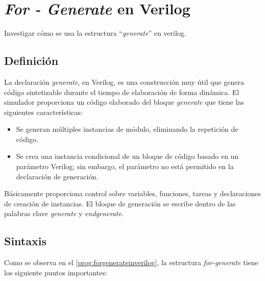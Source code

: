 \section{\textit{For - Generate} en Verilog \label{sec:s2}}

\begin{center}
	\begin{minipage}{12cm}
		\begin{tcolorbox}[title=Actividad 2]
			Investigar cómo se usa la estructura “\textit{generate}” en verilog.
		\end{tcolorbox}	
	\end{minipage}
\end{center}

\subsection{Definición}
La declaración \textit{generate}, en Verilog, es una construcción muy útil que genera código sintetizable durante el tiempo de elaboración de forma dinámica. El simulador proporciona un código elaborado del bloque \textit{generate} que tiene las siguientes características:

\begin{itemize}
	\item Se generan múltiples instancias de módulo, eliminando la repetición de código.
	\item Se crea una instancia condicional de un bloque de código basado en un parámetro Verilog; sin embargo, el parámetro no está permitido en la declaración de generación.
\end{itemize}

Básicamente proporciona control sobre variables, funciones, tareas y declaraciones de creación de instancias. El bloque de generación se escribe dentro de las palabras clave \textit{generate} y \textit{endgenerate}. \cite{vlsiverify}

\subsection{Sintaxis}
Como se observa en el \autoref{prog:forgenerateinverilog}, la estructura \textit{for-generate} tiene los siguiente puntos importantes:



